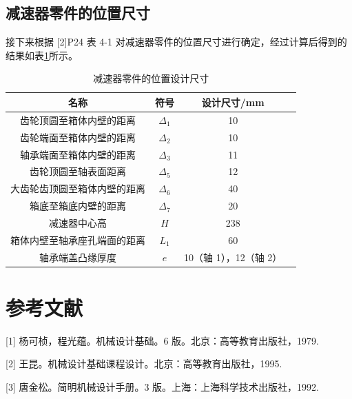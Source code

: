\documentclass[12pt]{ctexart}
\begin{document}
\subsection{减速器零件的位置尺寸}

接下来根据 [2]P24 表 4-1 对减速器零件的位置尺寸进行确定，经过计算后得到的结果如表\ref{table13}所示。

\begin{table}[htbp]
    \centering
    \begin{tabular}{c c c c}
        \toprule
        名称 & 符号 & 设计尺寸/mm \\
        \midrule
        齿轮顶圆至箱体内壁的距离     & $\Delta_1$ & 10 \\
        齿轮端面至箱体内壁的距离     & $\Delta_2$ & 10 \\
        轴承端面至箱体内壁的距离     & $\Delta_3$ & 11 \\
        齿轮顶圆至轴表面距离         & $\Delta_5$ & 12 \\
        大齿轮齿顶圆至箱体内壁的距离  & $\Delta_6$ & 40 \\
        箱底至箱底内壁的距离         & $\Delta_7$ & 20 \\
        减速器中心高                & $H$        & 238 \\
        箱体内壁至轴承座孔端面的距离  & $L_1$      & 60 \\
        轴承端盖凸缘厚度            & $e$         & 10（轴 1），12（轴 2）\\
        
        \bottomrule
    \end{tabular}
    \caption{减速器零件的位置设计尺寸}
    \label{table13}
\end{table}

\newpage

\section{参考文献}

[1] 杨可桢，程光蕴。机械设计基础。6 版。北京：高等教育出版社，1979.

[2] 王昆。机械设计基础课程设计。北京：高等教育出版社，1995.

[3] 唐金松。简明机械设计手册。3 版。上海：上海科学技术出版社，1992.
\end{document}
